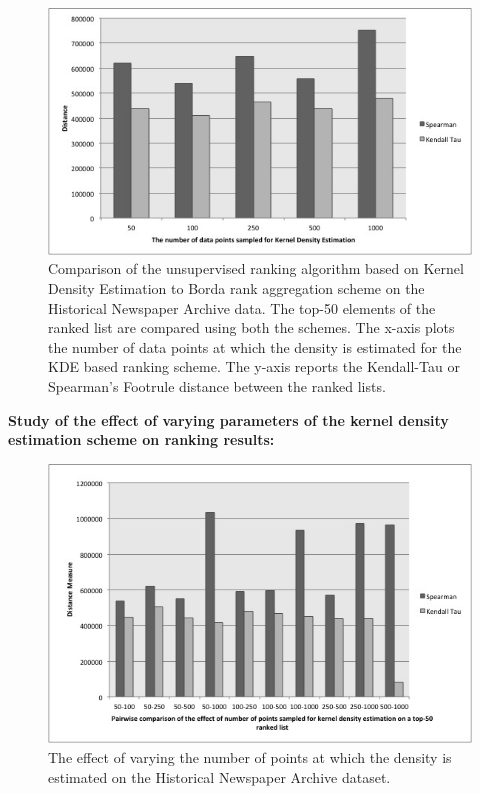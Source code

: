\documentclass[a4paper,man,natbib]{apa6}
\begin{document}
\begin{figure}[H]
\begin{center}
   \includegraphics[width=0.38\textheight]{KDEBorda.jpg}
    \caption{Comparison of the unsupervised ranking algorithm based on Kernel Density Estimation to Borda rank aggregation scheme on the Historical Newspaper Archive data. The top-50 elements of the ranked list are compared using both the schemes. The x-axis plots the number of data points at which the density is estimated for the KDE based ranking scheme. The y-axis reports the Kendall-Tau or Spearman's Footrule distance between the ranked lists. }
    \label{KDEBorda-OCR}
\end{center}   
\end{figure}

\textbf{Study of the effect of varying parameters of the kernel density estimation scheme on ranking results:}

\begin{figure}[H]
\begin{center}
   \includegraphics[width=0.38\textheight]{VaryingNoOfPtsKDE.jpg}
    \caption{The effect of varying the number of points at which the density is estimated on the Historical Newspaper Archive dataset.}
    \label{KDEVaryNoOfPts}
\end{center}   
\end{figure}
\end{document}
